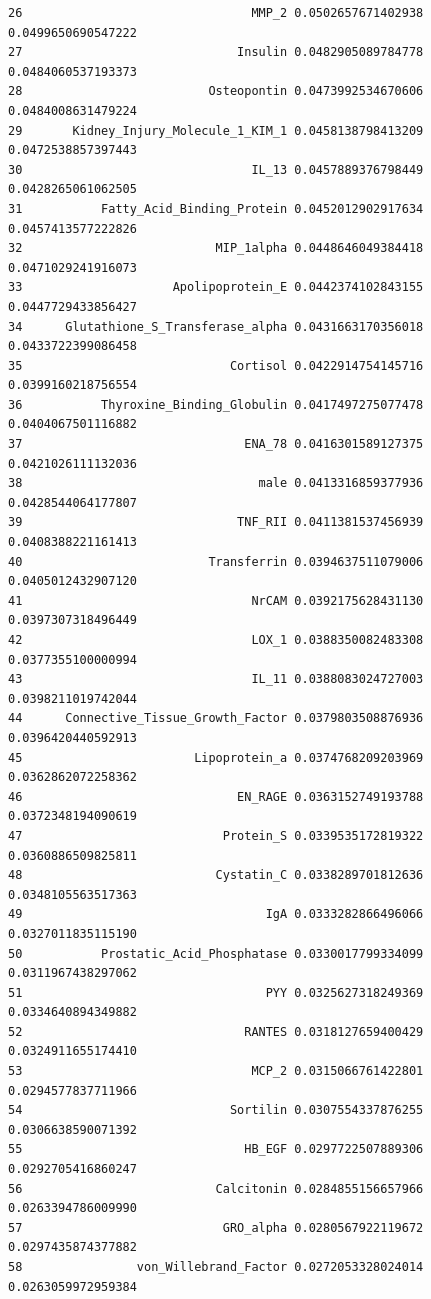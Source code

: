 \documentclass[
  letterpaper,
  DIV=11,
  numbers=noendperiod]{scrartcl}
\begin{document}
\begin{verbatim}
26                                MMP_2 0.0502657671402938  0.0499650690547222
27                              Insulin 0.0482905089784778  0.0484060537193373
28                          Osteopontin 0.0473992534670606  0.0484008631479224
29       Kidney_Injury_Molecule_1_KIM_1 0.0458138798413209  0.0472538857397443
30                                IL_13 0.0457889376798449  0.0428265061062505
31           Fatty_Acid_Binding_Protein 0.0452012902917634  0.0457413577222826
32                           MIP_1alpha 0.0448646049384418  0.0471029241916073
33                     Apolipoprotein_E 0.0442374102843155  0.0447729433856427
34      Glutathione_S_Transferase_alpha 0.0431663170356018  0.0433722399086458
35                             Cortisol 0.0422914754145716  0.0399160218756554
36           Thyroxine_Binding_Globulin 0.0417497275077478  0.0404067501116882
37                               ENA_78 0.0416301589127375  0.0421026111132036
38                                 male 0.0413316859377936  0.0428544064177807
39                              TNF_RII 0.0411381537456939  0.0408388221161413
40                          Transferrin 0.0394637511079006  0.0405012432907120
41                                NrCAM 0.0392175628431130  0.0397307318496449
42                                LOX_1 0.0388350082483308  0.0377355100000994
43                                IL_11 0.0388083024727003  0.0398211019742044
44      Connective_Tissue_Growth_Factor 0.0379803508876936  0.0396420440592913
45                        Lipoprotein_a 0.0374768209203969  0.0362862072258362
46                              EN_RAGE 0.0363152749193788  0.0372348194090619
47                            Protein_S 0.0339535172819322  0.0360886509825811
48                           Cystatin_C 0.0338289701812636  0.0348105563517363
49                                  IgA 0.0333282866496066  0.0327011835115190
50           Prostatic_Acid_Phosphatase 0.0330017799334099  0.0311967438297062
51                                  PYY 0.0325627318249369  0.0334640894349882
52                               RANTES 0.0318127659400429  0.0324911655174410
53                                MCP_2 0.0315066761422801  0.0294577837711966
54                             Sortilin 0.0307554337876255  0.0306638590071392
55                               HB_EGF 0.0297722507889306  0.0292705416860247
56                           Calcitonin 0.0284855156657966  0.0263394786009990
57                            GRO_alpha 0.0280567922119672  0.0297435874377882
58                von_Willebrand_Factor 0.0272053328024014  0.0263059972959384

\end{verbatim}
\end{document}
